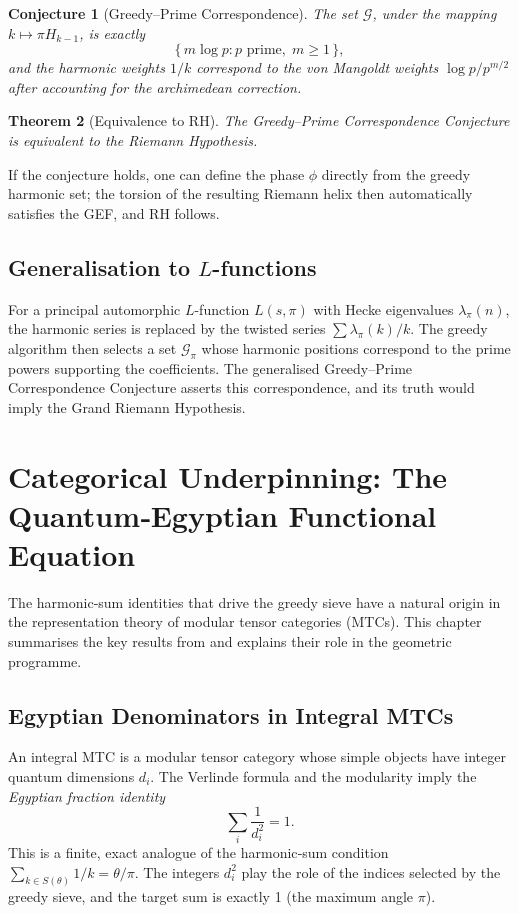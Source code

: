 \documentclass[12pt,a4paper,twoside]{book}
\newtheorem{theorem}{Theorem}[chapter]
\newtheorem{conjecture}[theorem]{Conjecture}
\begin{document}
\begin{conjecture}[Greedy--Prime Correspondence]\label{conj:GPC}
The set \(\mathcal{G}\), under the mapping \(k \mapsto \pi H_{k-1}\), is exactly
\[
\{\, m\log p : p \text{ prime},\; m\ge 1 \,\},
\]
and the harmonic weights \(1/k\) correspond to the von Mangoldt weights \(\log p/p^{m/2}\) after accounting for the archimedean correction.
\end{conjecture}

\begin{theorem}[Equivalence to RH]
The Greedy--Prime Correspondence Conjecture is equivalent to the Riemann Hypothesis.
\end{theorem}

If the conjecture holds, one can define the phase \(\phi\) directly from the greedy harmonic set; the torsion of the resulting Riemann helix then automatically satisfies the GEF, and RH follows.

\section{Generalisation to \(L\)-functions}
For a principal automorphic \(L\)-function \(L(s,\pi)\) with Hecke eigenvalues \(\lambda_\pi(n)\), the harmonic series is replaced by the twisted series \(\sum \lambda_\pi(k)/k\).  The greedy algorithm then selects a set \(\mathcal{G}_\pi\) whose harmonic positions correspond to the prime powers supporting the coefficients.  The generalised Greedy--Prime Correspondence Conjecture asserts this correspondence, and its truth would imply the Grand Riemann Hypothesis.

\chapter{Categorical Underpinning: The Quantum‑Egyptian Functional Equation}

The harmonic‑sum identities that drive the greedy sieve have a natural origin in the representation theory of modular tensor categories (MTCs).  This chapter summarises the key results from \cite{QEFE} and explains their role in the geometric programme.

\section{Egyptian Denominators in Integral MTCs}
An integral MTC is a modular tensor category whose simple objects have integer quantum dimensions \(d_i\).  The Verlinde formula and the modularity imply the \emph{Egyptian fraction identity}
\[
\sum_i \frac{1}{d_i^2} = 1 .
\]
This is a finite, exact analogue of the harmonic‑sum condition \(\sum_{k\in S(\theta)} 1/k = \theta/\pi\).  The integers \(d_i^2\) play the role of the indices selected by the greedy sieve, and the target sum is exactly 1 (the maximum angle \(\pi\)).
\end{document}
